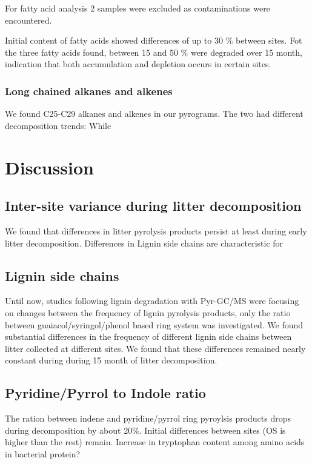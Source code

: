 \documentclass[preprint,review,12pt]{elsarticle}
\begin{document}
For fatty acid analysis 2 samples were excluded as contaminations were encountered.

Initial content of fatty acids showed differences of up to 30 \% between sites.
Fot the three fatty acids found, between 15 and 50 \% were degraded over 15 month, indication that both accumulation and depletion occurs in certain sites.

\subsubsection{Long chained alkanes and alkenes}

We found C25-C29 alkanes and alkenes in our pyrograms. The two had different decomposition trends: While

\section{Discussion}

\subsection{Inter-site variance during litter decomposition}
We found that differences in litter pyrolysis products persist at least during early litter decomposition. Differences in Lignin side chains are characteristic for

\subsection{Lignin side chains}
Until now, studies following lignin degradation with Pyr-GC/MS were focusing on changes between the frequency of lignin pyrolysis products, only the ratio between guaiacol/syringol/phenol based ring system was investigated. We found substantial differences in the frequency of different lignin side chains between litter collected at different sites. We found that these differences remained nearly constant during during 15 month of litter decomposition.

\subsection{Pyridine/Pyrrol to Indole ratio}

The ration between indene and pyridine/pyrrol ring pyroylsis products drops during decomposition by about 20\%. Initial differences between sites (OS is higher than the rest) remain.
Increase in tryptophan content among amino acids in bacterial protein?
\end{document}
